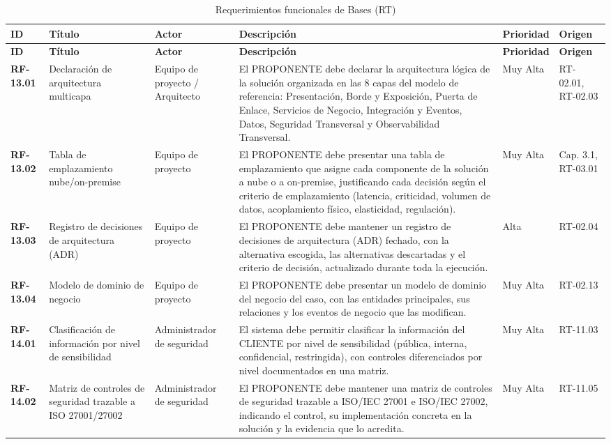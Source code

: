 ﻿\begin{longtable}{p{1.7cm} p{2.3cm} p{1.9cm} p{5.0cm} p{1.1cm} p{1.9cm}}
\caption{Requerimientos funcionales de Bases (RT)}\label{tab:bt_rf}\\
\toprule
\textbf{ID} & \textbf{T\'itulo} & \textbf{Actor} & \textbf{Descripci\'on} & \textbf{Prioridad} & \textbf{Origen} \\
\midrule
\endfirsthead
\toprule
\textbf{ID} & \textbf{T\'itulo} & \textbf{Actor} & \textbf{Descripci\'on} & \textbf{Prioridad} & \textbf{Origen} \\
\midrule
\endhead
\bottomrule
\endlastfoot
\textbf{RF-13.01} & Declaración de arquitectura multicapa & Equipo de proyecto / Arquitecto & El PROPONENTE debe declarar la arquitectura lógica de la solución organizada en las 8 capas del modelo de referencia: Presentación, Borde y Exposición, Puerta de Enlace, Servicios de Negocio, Integración y Eventos, Datos, Seguridad Transversal y Observabilidad Transversal. & Muy Alta & RT-02.01, RT-02.03 \\
\textbf{RF-13.02} & Tabla de emplazamiento nube/on-premise & Equipo de proyecto & El PROPONENTE debe presentar una tabla de emplazamiento que asigne cada componente de la solución a nube o a on-premise, justificando cada decisión según el criterio de emplazamiento (latencia, criticidad, volumen de datos, acoplamiento físico, elasticidad, regulación). & Muy Alta & Cap. 3.1, RT-03.01 \\
\textbf{RF-13.03} & Registro de decisiones de arquitectura (ADR) & Equipo de proyecto & El PROPONENTE debe mantener un registro de decisiones de arquitectura (ADR) fechado, con la alternativa escogida, las alternativas descartadas y el criterio de decisión, actualizado durante toda la ejecución. & Alta & RT-02.04 \\
\textbf{RF-13.04} & Modelo de dominio de negocio & Equipo de proyecto & El PROPONENTE debe presentar un modelo de dominio del negocio del caso, con las entidades principales, sus relaciones y los eventos de negocio que las modifican. & Muy Alta & RT-02.13 \\
\textbf{RF-14.01} & Clasificación de información por nivel de sensibilidad & Administrador de seguridad & El sistema debe permitir clasificar la información del CLIENTE por nivel de sensibilidad (pública, interna, confidencial, restringida), con controles diferenciados por nivel documentados en una matriz. & Muy Alta & RT-11.03 \\
\textbf{RF-14.02} & Matriz de controles de seguridad trazable a ISO 27001/27002 & Administrador de seguridad & El PROPONENTE debe mantener una matriz de controles de seguridad trazable a ISO/IEC 27001 e ISO/IEC 27002, indicando el control, su implementación concreta en la solución y la evidencia que lo acredita. & Muy Alta & RT-11.05 \\

\end{longtable}
